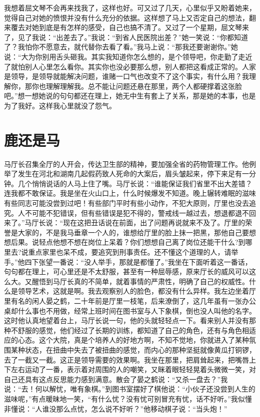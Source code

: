 \documentclass[12pt,oneside]{book}
\begin{document}
我想着屈文琴不会再来找我了，这样也好。可又过了几天，心里似乎又盼着她来，觉得自己对她的愤恨并没有什么充分的依据。这样想了马上又否定自己的想法，翻来覆去对她到底是有怎样的感受，自己也搞不清了。又过了一个星期，屈文琴来了，见了我说：``出差去了。''我说：``到省人民医院出差？''她一笑说：``你都知道了？我怕你不愿意去，就代替你去看了看。''我马上说：``那我还要谢谢你。''她说：``大为你别用舌头砸我。其实我知道你怎么想的，是个领导吧，你走勤了走近了就怕别人心里怎么看你。其实你也没必要那么想，别人都把这看成正常的。人家是领导，是领导就能解决问题，谁赌一口气也改变不了这个事实，有什么用？我理解你，那你也理解理解我。总不能让问题还悬在那里，两个人都硬撑着这张脸吧。''想一想她说的句句都还在理上，她无中生有套上了关系，那是她的本事，也是为了我好。这样我心里就没了怨气。


\chapter{鹿还是马}
马厅长召集全厅的人开会，传达卫生部的精神，要加强全省的药物管理工作。他例举了发生在河北和湖南几起假药致人死命的大案后，眉头皱起来，停下来足有一分钟。几个悄悄说话的人马上住了嘴。马厅长说：``谁能保证我们省里不出大差错？连我都不敢保证。我是坐在火山口上，什么时候爆发不知道。晚上辗转难眠的滋味有些同志可能没尝到过吧！有些部门平时有些小动作，不犯大原则，厅里也没去追究。人不可能不犯错误，但有些错误是犯不得的，警戒线一越过去，想退都退不回来了。''马厅长说：``现在这把丑话说在前面，出了问题再说就来不及了。厅里的荣誉是大家的，不是我马垂章一个人的，谁想给厅里的脸上抹一把黑，那他自己要想想后果。说轻点他想不想在岗位上呆着？你们想想自己离了岗位还能干什么?到哪里去?说重点家里也呆不成，要追究到刑事责任。还不懂这个道理的人，请举手。''他四下张望一番说：``没人举手，那就是都懂了。''我坐在下面听着这一番话，句句都在理上，可心里还是不太舒服，甚至有一种屈辱感，原来厅长的威风可以这么大。又醒悟到马厅长真的不简单，就着事情的严肃性，明确了自己的权威性。什么是领导艺术，这就是啊。我去观察别人的脸色，都没有什么异样。我左边坐着厅里有名的闲人晏之鹤，二十年前是厅里一枝笔，后来潦倒了，这几年虽有一张办公桌却什么事也不用做，经常上班时间在图书室与人下象棋，倒也没人叫他的名字。这时他认真地望着台上，马厅长说一句，他的头就轻轻点一下。看来别人并没有那种不舒服的感觉，他们经过了长期的训练，都知道了自己的角色，还有与角色相适应的心态。这个大院，真是个培养人的好地方啊，不知不觉地，你就进入了某种氛围某种状态，在扭曲中失去了被扭曲的感觉，而内心的那种坚挺就像黄瓜打铜锣，去了一截又一截。这正是领导需要的效果啊。我坐在那里，把肩耸起来，把嘴唇上下左右运动了一番，表示着对周围的人的嘲笑，又眯着眼轻轻晃着头微微一笑，对自己还具有这点反思能力感到满意。散会了晏之鹤说：``又杀一盘去？''我说：``去！何以解忧，唯有象棋。''到图书室摆好了棋他说：``小伙子还没尝到人生的滋味呢，''有点暖昧地一笑，``有什么忧？没有忧可别冒充有忧，话不好听。''我似懂非懂说：``人谁没那么点忧，怎么说不好听？''他移动棋子说：``当头炮！''
\end{document}
